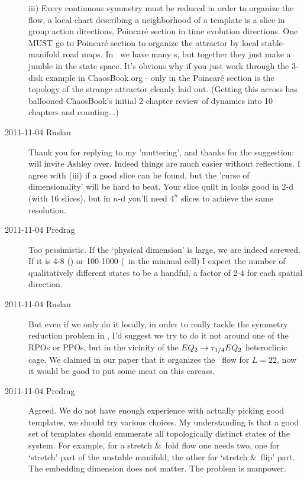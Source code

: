 \begin{description}
iii) Every continuous symmetry must be reduced in order
to organize the flow, a local chart describing a neighborhood of a
template is a slice in group action directions, Poincar\'e section in
time evolution directions. One MUST go to Poincar\'e section to organize
the attractor by local stable-manifold road maps. In \pCf\ we have many
\po s, but together they just make a jumble in the state space. It's obvious
why if you just work through the 3-disk example in ChaosBook.org - only
in the Poincar\'e section is the topology of the strange attractor
cleanly laid out. (Getting this across has ballooned ChaosBook's
initial 2-chapter review of dynamics into 10 chapters and counting...)

\item[2011-11-04 Ruslan] Thank you for replying to my 'muttering', and
thanks for the suggestion: will invite Ashley over.  Indeed things are
much easier without reflections.  I agree with (iii) if a good slice can
be found, but the 'curse of dimensionality' will be hard to beat.  Your
slice quilt in  looks good in 2-d (with 16 slices),
but in $n$-d you'll need $4^n$ slices to achieve the same resolution.

\item[2011-11-04 Predrag] Too pessimistic. If the `physical dimension' is
large, we are indeed screwed. If it is 4-8 (\KS) or 100-1000 (\pCf\ in
the minimal cell) I expect the number of qualitatively different states
to be a handful, a factor of 2-4 for each spatial direction.
%

\item[2011-11-04 Ruslan]
But even if we only do it locally, in order to really tackle the symmetry
reduction problem in \KS, I'd suggest we try to do it not around one of
the RPOs or PPOs, but in the vicinity of the $EQ_{2} \to
\tau_{1/4}EQ_{2}$ heteroclinic cage.  We claimed in our paper that it
organizes the \KS\ flow for $L = 22$, now it would be good to put some
meat on this carcass.

\item[2011-11-04 Predrag] Agreed. We do not have enough experience with
actually picking good templates, we should try various choices. My
understanding is that a good set of templates should enumerate all topologically
distinct states of the system. For example, for a stretch \&\ fold flow
one needs two, one for `stretch' part of the unstable manifold, the other
for `stretch \&\ flip' part. The embedding dimension does not matter.
The problem is manpower.


\end{description}
